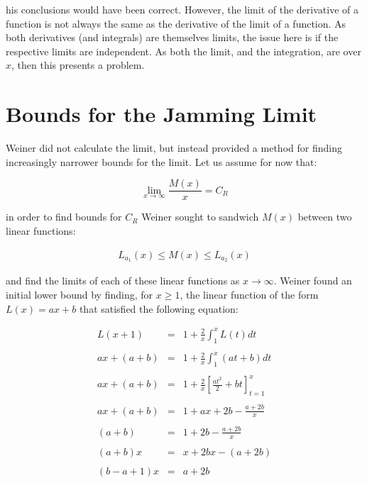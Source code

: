 his conclusions would have been correct. However, the limit of the derivative of a function is not always 
the same as the derivative of the limit of a function. As both derivatives (and integrals) are themselves 
limits, the issue here is if the respective limits are independent. As both the limit, and the integration, 
are over $x$, then this presents a problem. \bigskip











\section{Bounds for the Jamming Limit}

Weiner did not calculate the limit, but instead provided a method for finding increasingly narrower bounds 
for the limit. Let us assume for now that: \bigskip

\[
	\lim_{x \to \infty} \frac{M(x)}{x} = C_R
\]\medskip

in order to find bounds for $C_R$ Weiner sought to sandwich $M(x)$ between two linear functions: \bigskip

\begin{eqnarray} \label{eq:6}
	L_{a_1}(x) \leq M(x) \leq L_{a_2}(x)
\end{eqnarray}\medskip

and find the limits of each of these linear functions as $x \to \infty$. Weiner found an initial lower bound 
by finding, for $x \geq 1$, the linear function of the form $L(x) = ax + b$ that satisfied the following 
equation: \bigskip

\begin{eqnarray*}
		L(x + 1) & = & 1 + \frac{2}{x} \int_{1}^{x} L(t) dt \\\\
	ax + (a + b) & = & 1 + \frac{2}{x} \int_{1}^{x} (at + b) dt \\\\
	ax + (a + b) & = & 1 + \frac{2}{x} \left[ \frac{at^2}{2} + bt \right]_{t = 1}^{x} \\\\
	ax + (a + b) & = & 1 + ax + 2b - \frac{a + 2b}{x} \\\\
		 (a + b) & = & 1 + 2b - \frac{a + 2b}{x} \\\\
		(a + b)x & = & x + 2bx - ( a + 2b ) \\\\
	(b - a + 1)x & = & a + 2b 
\end{eqnarray*}\medskip

